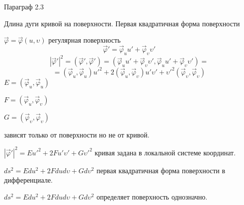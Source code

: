 \begin{title}[\Large]
  Параграф 2.3
\end{title}

\begin{title}[\Large]
  Длина дуги кривой на поверхности. Первая квадратичная форма поверхности
\end{title}

\begin{define}
  $\vec \varphi = \vec \varphi(u, \upsilon)$ регулярная поверхность
  $$
  \vec \varphi' = \vec \varphi_u u' + \vec \varphi_{\upsilon} \upsilon'
  $$
  $$
  |\vec \varphi'|^2 = (\vec \varphi', \vec \varphi') =
  (\vec \varphi_u u' + \vec \varphi_{\upsilon} \upsilon',
  \vec \varphi_u u' + \vec \varphi_{\upsilon} \upsilon') =
  $$
  $$
  = (\vec \varphi_u, \vec \varphi_u)u'^2 + 2(\vec \varphi_u,
  \vec \varphi_{\upsilon}) u' \upsilon' + \upsilon'^2 (\vec \varphi_{\upsilon},
  \vec \varphi_{\upsilon})
  $$
  $E = (\vec \varphi_u, \vec \varphi_u)$

  $F = (\vec \varphi_u, \vec \varphi_{\upsilon})$

  $G = (\vec \varphi_{\upsilon}, \vec \varphi_{\upsilon})$

  зависят только от поверхности но не от кривой.

  $|\vec \varphi'|^2 = E u'^2 + 2Fu'\upsilon' + G\upsilon'^2$ кривая задана в
  локальной системе координат.

  $ds^2 = Edu^2 + 2Fdud\upsilon + Gd\upsilon^2$ первая квадратичная форма
  поверхности в дифференциале.

  $ds^2 = Edu^2 + 2Fdud\upsilon + Gd\upsilon^2$ определяет поверхность
  однозначно.
\end{define}

